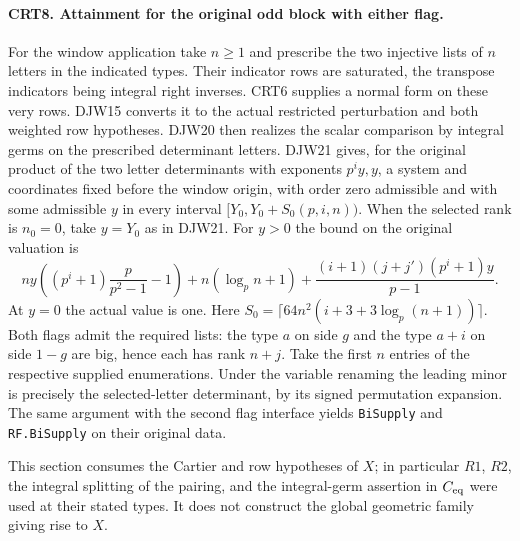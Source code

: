 \paragraph{CRT8. Attainment for the original odd block with either flag.}
For the window application take $n\ge1$ and prescribe the two
injective lists of $n$ letters in the indicated types. Their
indicator rows are saturated, the transpose indicators being integral
right inverses. CRT6 supplies a normal form on these very rows.
DJW15 converts it to the actual restricted perturbation and both
weighted row hypotheses. DJW20 then realizes the scalar comparison
by integral germs on the prescribed determinant letters. DJW21
gives, for the original product of the two letter determinants with
exponents $p^iy,y$, a system and coordinates fixed before the window
origin, with order zero admissible and with some admissible $y$ in
every interval $[Y_0,Y_0+S_0(p,i,n))$. When the selected rank is $n_0=0$, take
$y=Y_0$ as in DJW21. For $y>0$ the bound on the original valuation is
\[
 ny\left((p^i+1)\frac{p}{p^2-1}-1\right)
 +n(\log_p n+1)+\frac{(i+1)(j+j')(p^i+1)y}{p-1}.
\]
At $y=0$ the actual value is one. Here
$S_0=\lceil64n^2(i+3+3\log_p(n+1))\rceil$.
Both flags admit the required lists: the type $a$ on side $g$ and
the type $a+i$ on side $1-g$ are big, hence each has rank $n+j$.
Take the first $n$ entries of the respective supplied enumerations.
Under the variable renaming the leading minor is precisely the
selected-letter determinant, by its signed permutation expansion.
The same argument with the second flag interface yields
\texttt{BiSupply} and \texttt{RF.BiSupply} on their original data.

This section consumes the Cartier and row hypotheses of $X$; in
particular $R1$, $R2$, the integral splitting of the pairing, and
the integral-germ assertion in $C_{\rm eq}$ were used at their
stated types. It does not construct the global geometric family
giving rise to $X$.
